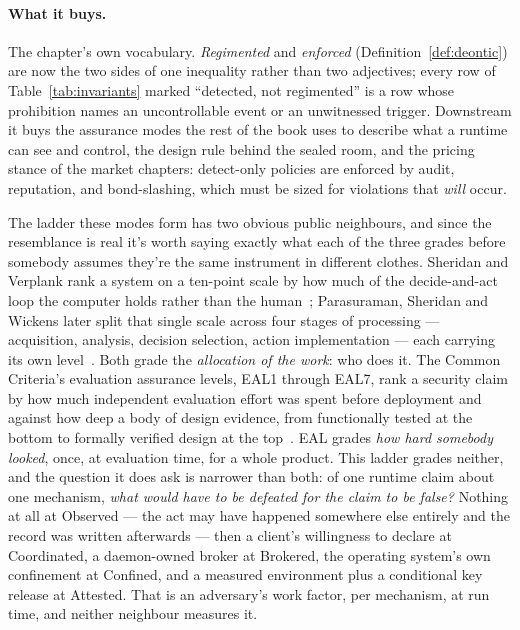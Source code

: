 \documentclass[11pt,a4paper]{article}
\theoremstyle{definition}
\theoremstyle{remark}
\begin{document}

\FloatBarrier

\paragraph{What it buys.}
The chapter's own vocabulary. \emph{Regimented} and \emph{enforced}
(Definition~\ref{def:deontic}) are now the two sides of one inequality rather than two
adjectives; every row of Table~\ref{tab:invariants} marked ``detected, not regimented'' is a
row whose prohibition names an uncontrollable event or an unwitnessed trigger. Downstream it
buys the assurance modes the rest of the book uses to describe what a runtime can see and
control, the design rule behind the sealed room, and the pricing stance of the market
chapters: detect-only policies are enforced by audit, reputation, and bond-slashing, which
must be sized for violations that \emph{will} occur.

\pdmarginpagebreak
The ladder these modes form has two obvious public neighbours, and since the
resemblance is real it's worth saying exactly what each of the three grades
before somebody assumes they're the same instrument in different clothes.
Sheridan and Verplank rank a system on a ten-point scale by how much of the
decide-and-act loop the computer holds rather than the
human~; Parasuraman, Sheridan and Wickens later
split that single scale across four stages of processing --- acquisition,
analysis, decision selection, action implementation --- each carrying its own
level~. Both grade the \emph{allocation of the work}:
who does it. The Common Criteria's evaluation assurance levels, EAL1 through
EAL7, rank a security claim by how much independent evaluation effort was spent
before deployment and against how deep a body of design evidence, from
functionally tested at the bottom to formally verified design at the
top~. EAL grades \emph{how hard somebody looked}, once, at
evaluation time, for a whole product. This ladder grades neither, and the
question it does ask is narrower than both: of one runtime claim about one
mechanism, \emph{what would have to be defeated for the claim to be false?}
Nothing at all at Observed --- the act may have happened somewhere else
entirely and the record was written afterwards --- then a client's willingness
to declare at Coordinated, a daemon-owned broker at Brokered, the operating
system's own confinement at Confined, and a measured environment plus a
conditional key release at Attested. That is an adversary's work factor, per
mechanism, at run time, and neither neighbour measures it.
\end{document}
